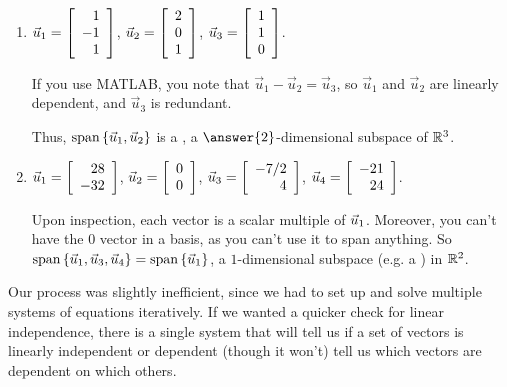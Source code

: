 \documentclass{ximera}
\begin{document}
\begin{exploration}
\begin{example}
\begin{enumerate}
\begin{solution}
    \end{solution}

    \item $\vect{u}_1=\startmat{r} 1 \\ -1 \\ 1 \stopmat$, $\vect{u}_2=\startmat{r} 2 \\ 0 \\ 1 \stopmat$, $\vect{u}_3=\startmat{r} 1 \\ 1 \\ 0 \stopmat$.
    
    \begin{solution}
    
      If you use MATLAB, you note that $\vec{u}_1-\vec{u}_2=\vec{u}_3$, so $\vec{u}_1$ and $\vec{u}_2$ are linearly dependent, and $\vec{u}_3$ is redundant.
      
      Thus, $\sspan\set{\vect{u}_1,\vect{u}_2}$ is a , a $\answer{2}$-dimensional subspace of $\R^3$.

    \end{solution}

    \item $\vect{u}_1=\startmat{r} 28 \\ -32 \stopmat$, $\vect{u}_2=\startmat{r} 0 \\ 0 \stopmat$, $\vect{u}_3=\startmat{r} -7/2 \\ 4 \stopmat$, $\vect{u}_4=\startmat{r} -21 \\ 24 \stopmat$.
    
    \begin{solution}
    
      Upon inspection, each vector is a scalar multiple of $\vect{u}_1$. Moreover, you can't have the $0$ vector in a basis, as you can't use it to span anything. So $\sspan\set{\vect{u}_1, \vect{u}_3, \vect{u}_4}=\sspan\set{\vect{u}_1}$, a $1$-dimensional subspace (e.g. a ) in $\R^2$.

    \end{solution}
    
  \end{enumerate}

\end{example}

\begin{remark}
Our process was slightly inefficient, since we had to set up and solve multiple systems of equations iteratively. If we wanted a quicker check for linear independence, there is a single system that will tell us if a set of vectors is linearly independent or dependent (though it won't) tell us which vectors are dependent on which others. 


\end{remark}
\end{exploration}
\end{document}
